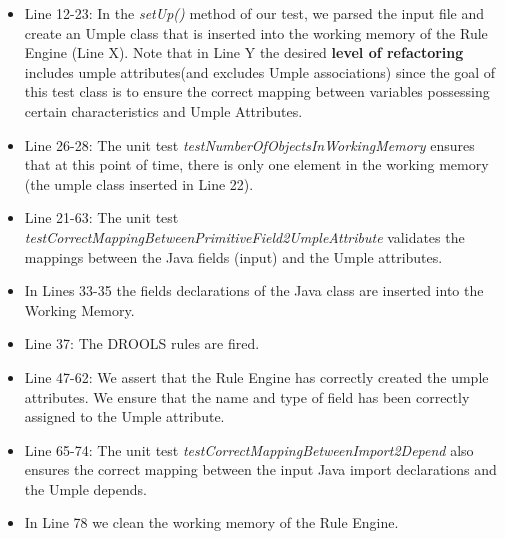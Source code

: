 \begin{itemize}
\item Line 12-23: In the \textit{setUp()} method of our test, we parsed the input file and create an Umple class that is inserted into the working memory of the Rule Engine (Line X). Note that in Line Y  the desired \textbf{level of refactoring} includes umple attributes(and excludes Umple associations) since the goal of this test class is to ensure the correct mapping between variables possessing certain characteristics and Umple Attributes.

\item Line 26-28: The unit test \textit{testNumberOfObjectsInWorkingMemory} ensures that at this point of time, there is only one element in the working memory (the umple class inserted in Line 22).

\item Line 21-63: The unit test \textit{testCorrectMappingBetweenPrimitiveField2UmpleAttribute} validates the mappings between the Java fields (input) and the Umple attributes. 

\item In Lines 33-35 the fields declarations of the Java class are inserted into the Working Memory. 

\item Line 37: The DROOLS rules are fired. 

\item Line 47-62: We assert that the Rule Engine has correctly created the umple attributes. We ensure that the name and type of field has been correctly assigned to the Umple attribute.

\item Line 65-74: The unit test \textit{testCorrectMappingBetweenImport2Depend} also ensures the correct mapping between the input Java import declarations and the Umple depends.

\item In Line 78 we clean the working memory of the Rule Engine.
\end{itemize}


